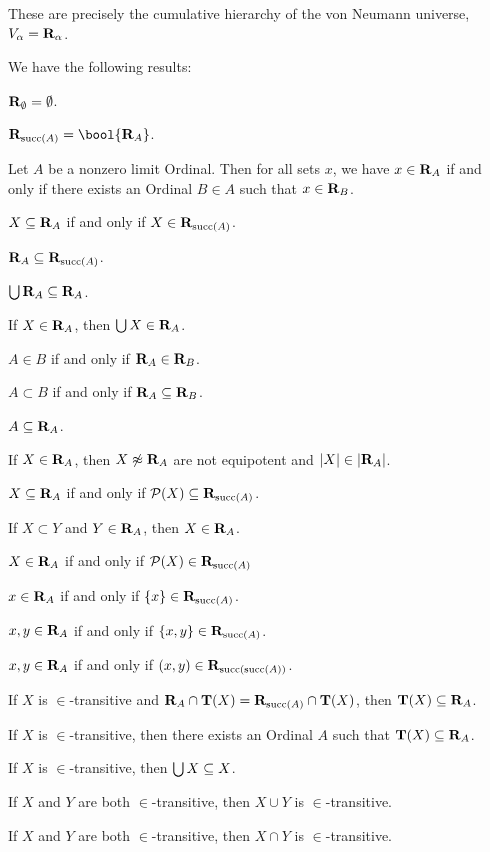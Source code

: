 \documentclass{article}
\begin{document}
\begin{remark}
These are precisely the cumulative hierarchy of the von Neumann
universe, $V_{\alpha}=\mathbf{R}_{\alpha}$.
\end{remark}

We have the following results:
\begin{thm}
\item\label{classes1:29} $\mathbf{R}_{\emptyset}=\emptyset$.
\item\label{classes1:30} $\Rank{\succ(A)}=\bool{\Rank{A}}$.
\item\label{classes1:31} Let $A$ be a nonzero limit Ordinal.
  Then for all sets $x$, we have $x\in\mathbf{R}_{A}$ if and only if there
  exists an Ordinal $B\in A$ such that $x\in\mathbf{R}_{B}$.
\item\label{classes1:32} $X\subseteq\mathbf{R}_{A}$ if and only if $X\in\mathbf{R}_{\operatorname{succ}(A)}$.
\item\label{classes1:33} $\mathbf{R}_{A}\subseteq\mathbf{R}_{\operatorname{succ}(A)}$.
\item\label{classes1:34} $\bigcup\mathbf{R}_{A}\subseteq\mathbf{R}_{A}$.
\item\label{classes1:35} If $X\in\mathbf{R}_{A}$, then $\bigcup X\in\mathbf{R}_{A}$.
\item\label{classes1:36} $A\in B$ if and only if $\mathbf{R}_{A}\in\mathbf{R}_{B}$.
\item\label{classes1:37} $A\subset B$ if and only if $\mathbf{R}_{A}\subseteq\mathbf{R}_{B}$.
\item\label{classes1:38} $A\subseteq\mathbf{R}_{A}$.
\item\label{classes1:39} If $X\in\mathbf{R}_{A}$, then $X\not\approx\mathbf{R}_{A}$
  are not equipotent and $|X|\in|\mathbf{R}_{A}|$.
\item\label{classes1:40} $X\subseteq\mathbf{R}_{A}$ if and only if $\mathcal{P}(X)\subseteq\mathbf{R}_{\operatorname{succ}(A)}$.
\item\label{classes1:41} If $X\subset Y$ and $Y\in\mathbf{R}_{A}$, then $X\in\mathbf{R}_{A}$.
\item\label{classes1:42} $X\in\mathbf{R}_{A}$ if and only if $\mathcal{P}(X)\in\mathbf{R}_{\operatorname{succ}(A)}$
\item\label{classes1:43} $x\in\mathbf{R}_{A}$ if and only if $\{x\}\in\mathbf{R}_{\operatorname{succ}(A)}$.
\item\label{classes1:44} $x,y\in\mathbf{R}_{A}$ if and only if $\{x,y\}\in\mathbf{R}_{\operatorname{succ}(A)}$.
\item\label{classes1:45} $x,y\in\mathbf{R}_{A}$ if and only if $(x,y)\in\mathbf{R}_{\operatorname{succ}(\operatorname{succ}(A))}$.
\item\label{classes1:46} If $X$ is $\in$-transitive and $\Rank{A}\cap\TarskiClass{X}=\Rank{\succ(A)}\cap\TarskiClass{X}$,
  then $\TarskiClass{X}\subset\Rank{A}$.
\item\label{classes1:47} If $X$ is $\in$-transitive,
  then there exists an Ordinal $A$ such that $\TarskiClass{X}\subset\Rank{A}$.
\item\label{classes1:48} If $X$ is $\in$-transitive, then $\bigcup X\subseteq X$.
\item\label{classes1:49} If $X$ and $Y$ are both $\in$-transitive, then
  $X\cup Y$ is $\in$-transitive.
\item\label{classes1:50} If $X$ and $Y$ are both $\in$-transitive, then
  $X\cap Y$ is $\in$-transitive.
\end{thm}
\end{document}
